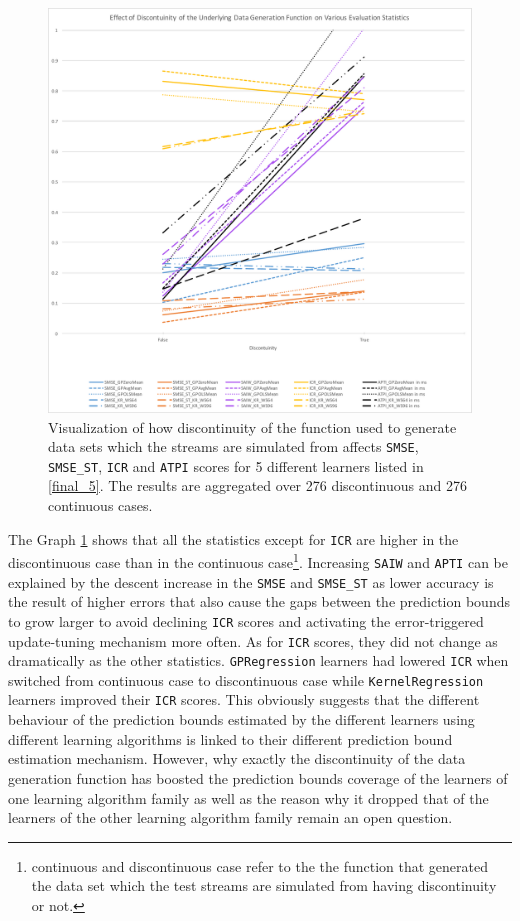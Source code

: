 \begin{figure}[htbp]
  \centering
    \includegraphics[width=\linewidth]{./Figures/disc_effect_on_final_5.pdf}
  \caption{Visualization of how discontinuity of the function used to generate data sets which the streams are simulated from affects \texttt{SMSE}, \texttt{SMSE\_ST}, \texttt{ICR} and \texttt{ATPI} scores for 5 different learners listed in \ref{final_5}. The results are aggregated over 276 discontinuous and 276 continuous cases.}
  \label{fig:disc_effect_on_final_5}
\end{figure}

The Graph \ref{fig:disc_effect_on_final_5} shows that all the statistics except for \texttt{ICR} are higher in the discontinuous case than in the continuous case\footnote{continuous and discontinuous case refer to the the function that generated the data set which the test streams are simulated from having discontinuity or not.}. Increasing \texttt{SAIW} and \texttt{APTI} can be explained by the descent increase in the \texttt{SMSE} and \texttt{SMSE\_ST} as lower accuracy is the result of higher errors that also cause the gaps between the prediction bounds to grow larger to avoid declining \texttt{ICR} scores and activating the error-triggered update-tuning mechanism more often. As for \texttt{ICR} scores, they did not change as dramatically as the other statistics. \texttt{GPRegression} learners had lowered \texttt{ICR} when switched from continuous case to discontinuous case while \texttt{KernelRegression} learners improved their \texttt{ICR} scores. This obviously suggests that the different behaviour of the prediction bounds estimated by the different learners using different learning algorithms is linked to their different prediction bound estimation mechanism. However, why exactly the discontinuity of the data generation function has boosted the prediction bounds coverage of the learners of one learning algorithm family as well as the reason why it dropped that of the learners of the other learning algorithm family remain an open question.

